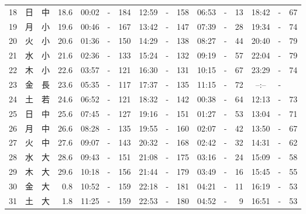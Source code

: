 \documentclass[12pt.a4j]{jsarticle}
\begin{document}
\begin{center}
\begin{table}[ht]
\begin{tabular}{|rc|cr|ccrccr|ccrccr|}
18 & 日 & 中 & 18.6 &  00:02 &-& 184  &  12:59 &-& 158  &   06:53 &-&  13  &   18:42 &-&  67  \\
19 & 月 & 小 & 19.6 &  00:46 &-& 167  &  13:42 &-& 147  &   07:39 &-&  28  &   19:34 &-&  74  \\
20 & 火 & 小 & 20.6 &  01:36 &-& 150  &  14:29 &-& 138  &   08:27 &-&  44  &   20:40 &-&  79  \\
21 & 水 & 小 & 21.6 &  02:36 &-& 133  &  15:24 &-& 132  &   09:19 &-&  57  &   22:04 &-&  79  \\
22 & 木 & 小 & 22.6 &  03:57 &-& 121  &  16:30 &-& 131  &   10:15 &-&  67  &   23:29 &-&  74  \\
23 & 金 & 長 & 23.6 &  05:35 &-& 117  &  17:37 &-& 135  &   11:15 &-&  72  &   --:-- &-&     \\
24 & 土 & 若 & 24.6 &  06:52 &-& 121  &  18:32 &-& 142  &   00:38 &-&  64  &   12:13 &-&  73  \\
25 & 日 & 中 & 25.6 &  07:45 &-& 127  &  19:16 &-& 151  &   01:27 &-&  53  &   13:04 &-&  71  \\
26 & 月 & 中 & 26.6 &  08:28 &-& 135  &  19:55 &-& 160  &   02:07 &-&  42  &   13:50 &-&  67  \\
27 & 火 & 中 & 27.6 &  09:07 &-& 143  &  20:32 &-& 168  &   02:42 &-&  32  &   14:31 &-&  62  \\
28 & 水 & 大 & 28.6 &  09:43 &-& 151  &  21:08 &-& 175  &   03:16 &-&  24  &   15:09 &-&  58  \\
29 & 木 & 大 & 29.6 &  10:18 &-& 156  &  21:44 &-& 179  &   03:49 &-&  16  &   15:45 &-&  55  \\
30 & 金 & 大 &  0.8 &  10:52 &-& 159  &  22:18 &-& 181  &   04:21 &-&  11  &   16:19 &-&  53  \\
31 & 土 & 大 &  1.8 &  11:25 &-& 159  &  22:53 &-& 180  &   04:52 &-&   9  &   16:51 &-&  53  \\
   \hline
   \end{tabular}
\end{table}
\newpage
\end{center}
\end{document}
